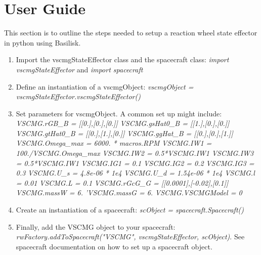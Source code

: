 \section{User Guide}

This section is to outline the steps needed to setup a reaction wheel state effector in python using Basilisk.

\begin{enumerate}
	\item Import the vscmgStateEffector class and the spacecraft class: \newline \textit{import vscmgStateEffector} and \textit{import spacecraft}
	\item Define an instantiation of a vscmgObject: \newline
	\textit{vscmgObject = vscmgStateEffector.vscmgStateEffector()}
	\item Set parameters for vscmgObject. A common set up might include: \newline
		\textit{VSCMG.rGB\_B = [[0.],[0.],[0.]]} \newline
         \textit{VSCMG.gsHat0\_B = [[1.],[0.],[0.]]} \newline
         \textit{VSCMG.gtHat0\_B = [[0.],[1.],[0.]]} \newline
         \textit{VSCMG.ggHat\_B = [[0.],[0.],[1.]]} \newline
         \textit{VSCMG.Omega\_max = 6000. * macros.RPM} \newline
         \textit{VSCMG.IW1 = 100./VSCMG.Omega\_max} \newline
         \textit{VSCMG.IW2 = 0.5*VSCMG.IW1} \newline
         \textit{VSCMG.IW3 = 0.5*VSCMG.IW1} \newline
         \textit{VSCMG.IG1 = 0.1} \newline
         \textit{VSCMG.IG2 = 0.2} \newline
         \textit{VSCMG.IG3 = 0.3} \newline
         \textit{VSCMG.U\_s = 4.8e-06 * 1e4} \newline
         \textit{VSCMG.U\_d = 1.54e-06 * 1e4} \newline
         \textit{VSCMG.l = 0.01} \newline
         \textit{VSCMG.L = 0.1} \newline
         \textit{VSCMG.rGcG\_G = [[0.0001],[-0.02],[0.1]]} \newline
         \textit{VSCMG.massW = 6.} \newline
         \textit{'VSCMG.massG = 6.} \newline
         \textit{VSCMG.VSCMGModel = 0} 
	\item Create an instantiation of a spacecraft: \newline
	\textit{scObject = spacecraft.Spacecraft()}
	\item Finally, add the VSCMG object to your spacecraft:\newline
	\textit{rwFactory.addToSpacecraft("VSCMG", vscmgStateEffector, scObject)}. See spacecraft documentation on how to set up a spacecraft object.
\end{enumerate}
